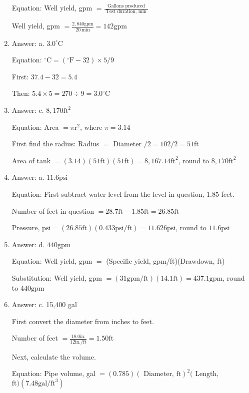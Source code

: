 \documentclass[10pt]{article}
\begin{document}
\begin{enumerate}
Equation: Well yield, gpm $=\frac{\text { Gallons produced }}{\text { Test duration, min }}$

Well yield, gpm $=\frac{2,840 \mathrm{gpm}}{20 \mathrm{~min}}=142 \mathrm{gpm}$

  \item Answer: a. $3.0^{\circ} \mathrm{C}$

Equation: ${ }^{\circ} \mathrm{C}=\left({ }^{\circ} \mathrm{F}-32\right) \times 5 / 9$

First: $37.4-32=5.4$

Then: $5.4 \times 5=270 \div 9=3.0^{\circ} \mathrm{C}$

  \item Answer: c. $8,170 \mathrm{ft}^{2}$

Equation: Area $=\pi \mathrm{r}^{2}$, where $\pi=3.14$

First find the radius: Radius $=$ Diameter $/ 2=102 / 2=51 \mathrm{ft}$

Area of tank $=(3.14)(51 \mathrm{ft})(51 \mathrm{ft})=8,167.14 \mathrm{ft}^{2}$, round to $8,170 \mathrm{ft}^{2}$

  \item Answer: a. $11.6 \mathrm{psi}$

Equation: First subtract water level from the level in question, $1.85$ feet.

Number of feet in question $=28.7 \mathrm{ft}-1.85 \mathrm{ft}=26.85 \mathrm{ft}$

Pressure, $\mathrm{psi}=(26.85 \mathrm{ft})(0.433 \mathrm{psi} / \mathrm{ft})=11.626 \mathrm{psi}$, round to $11.6 \mathrm{psi}$

  \item Answer: d. $440 \mathrm{gpm}$

Equation: Well yield, gpm $=$ (Specific yield, gpm/ft)(Drawdown, ft)

Substitution: Well yield, gpm $=(31 \mathrm{gpm} / \mathrm{ft})(14.1 \mathrm{ft})=437.1 \mathrm{gpm}$, round to $440 \mathrm{gpm}$

  \item Answer: c. 15,400 gal

First convert the diameter from inches to feet.

Number of feet $=\frac{18.0 \mathrm{in} .}{12 \mathrm{in} . / \mathrm{ft}}=1.50 \mathrm{ft}$

Next, calculate the volume.

Equation: Pipe volume, gal $=(0.785)(\text { Diameter, } \mathrm{ft})^{2}($ Length, $\mathrm{ft})\left(7.48 \mathrm{gal} / \mathrm{ft}^{3}\right)$


\end{enumerate}
\end{document}
